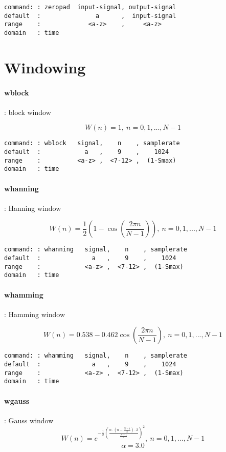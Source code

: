 \documentclass{report}
\newcommand{\bc}{\scriptsize}
\newcommand{\ec}{\normalsize}
\begin{document}
\bc
\begin{verbatim}
command: : zeropad  input-signal, output-signal
default  :               a      ,  input-signal
range    :             <a-z>    ,     <a-z>
domain   : time
\end{verbatim}
\ec

\section{Windowing}

\paragraph{wblock}: block window

\[ W(n) = 1,~ n = 0,1,...,N-1 \]

\bc
\begin{verbatim}
command: : wblock   signal,    n    , samplerate
default  :            a   ,    9    ,    1024
range    :          <a-z> ,  <7-12> ,  (1-Smax)
domain   : time
\end{verbatim}
\ec

\paragraph{whanning}: Hanning window

\[ W(n) = \frac{1}{2}\left( 1- \cos (\frac{2\pi n}{N-1}) \right) ,~ n = 0,1,...,N-1 \]

\bc
\begin{verbatim}
command: : whanning   signal,    n    , samplerate
default  :              a   ,    9    ,    1024
range    :            <a-z> ,  <7-12> ,  (1-Smax)
domain   : time
\end{verbatim}
\ec

\paragraph{whamming}: Hamming window

\[W(n) =  0.538 - 0.462 \cos (\frac{2\pi n}{N-1}) ,~ n = 0,1,...,N-1 \]

\bc
\begin{verbatim}
command: : whamming   signal,    n    , samplerate
default  :              a   ,    9    ,    1024
range    :            <a-z> ,  <7-12> ,  (1-Smax)
domain   : time
\end{verbatim}
\ec

\paragraph{wgauss}: Gauss window
\large
\[W(n) = e^{- \frac{1}{2} \left( \frac{\alpha \cdot (n - \frac{N-1}{2}) \cdot 2 }{\frac{N-1}{2}} \right)^{2}},~ n = 0,1,...,N-1 \]
\normalsize
\[ \alpha = 3.0 \]
\end{document}
